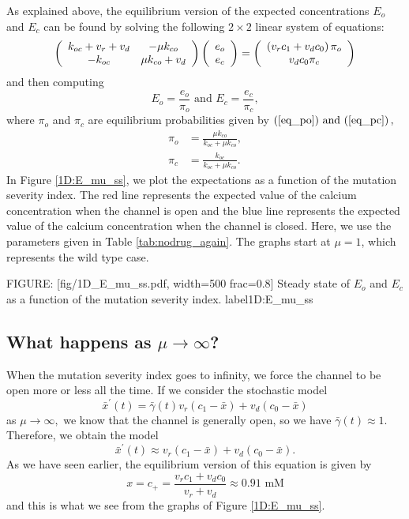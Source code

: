{As explained above, the equilibrium version of the expected concentrations
$E_{o}$ and $E_{c}$ can be found by solving the following $2\times2$ linear
system of equations:
\begin{equation}
\left(
\begin{array}
[c]{cc}
k_{oc}+v_{r}+v_{d} & -\mu k_{co}\\
-k_{oc} & \mu k_{co}+v_{d}
\end{array}
\right)  \left(
\begin{array}
[c]{c}
e_{o}\\
e_{c}
\end{array}
\right)  =\left(
\begin{array}
[c]{c}
\left(  v_{r}c_{1}+v_{d}c_{0}\right)  \pi_{o}\\
v_{d}c_{0}\pi_{c}
\end{array}
\right)  \label{expectation1001}
\end{equation}
and then computing
\[
E_{o}=\frac{e_{o}}{\pi_{o}}\text{ and }E_{c}=\frac{e_{c}}{\pi_{c}},
\]
where $\pi_{o}$ and $\pi_{c}$ are equilibrium probabilities given by $\left(
\ref{eq_po})\text{ and (}\ref{eq_pc}\right)  ,$
\begin{align}
\pi_{o} &  =\frac{\mu k_{co}}{k_{oc}+\mu k_{co}}, \label{200}\\
\pi_{c} &  =\frac{k_{oc}}{k_{oc}+\mu k_{co}}. \label{201}
\end{align}
In Figure \ref{1D:E_mu_ss}, we plot the expectations as a function of the
mutation severity index. The red line represents the expected value of the
calcium concentration when the channel is open and the blue line represents
the expected value of the calcium concentration when the channel is closed.
Here, we use the parameters given in Table \ref{tab:nodrug_again}. The graphs
start at $\mu=1$, which represents the wild type case.

FIGURE: [fig/1D_E_mu_ss.pdf, width=500 frac=0.8] Steady state of $E_o$ and $E_c$ as a function of the mutation severity index. label{1D:E_mu_ss}\bigskip 
\subsection{What happens as $\mu\longrightarrow \infty$?}
When the mutation severity index goes to infinity, we force the
channel to be open more or less all the time. If we consider the stochastic
model
\[
\bar{x}^{\prime}(t)=\bar{\gamma}(t)v_{r}(c_{1}-\bar{x})+v_{d}(c_{0}-\bar{x})
\]
as $\mu\longrightarrow\infty,$ we know that the channel is generally
open, so we have $\bar{\gamma}(t)\approx1.$  Therefore, we obtain the model
\[
\bar{x}^{\prime}(t)\approx v_{r}(c_{1}-\bar{x})+v_{d}(c_{0}-\bar{x}).
\]
As we have seen earlier, the equilibrium version of this equation is given by
\[
x=c_{+}=\frac{v_{r}c_{1}+v_{d}c_{0}}{v_{r}+v_{d}}\approx0.91\text{ mM}
\]
and this is what we see from the graphs of Figure \ref{1D:E_mu_ss}.

}

